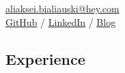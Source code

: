\documentclass{h1alexbel}
\begin{document}
    \sffamily

    \printPhoto{}

    {\scshape\bfseries\Large {}}\newline
    \href{mailto:aliaksei.bialiauski@hey.com}{aliaksei.bialiauski@hey.com}\\
    \href{https://github.com/h1alexbel}{GitHub} /
    \href{https://www.linkedin.com/in/h1alexbel/}{LinkedIn} /
    \href{https://h1alexbel.github.io}{Blog}

    \subsection*{Experience}
    \vspace{-7pt}
    \small
\end{document}
